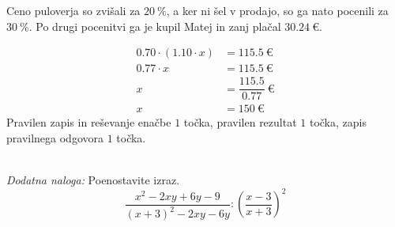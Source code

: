 \documentclass[addpoints]{exam}
\begin{document}
\begin{questions}
        \newpage


        \question
        Ceno puloverja so zvišali za $20~\%$, a ker ni šel v prodajo, so ga nato pocenili za $30~\%$.
        Po drugi pocenitvi ga je kupil Matej in zanj plačal $30.24~\euro$.


        \begin{solution}[4cm]
            \begin{align*}
                0.70\cdot \left(1.10\cdot x\right) &=115.5~\euro \\
                                     0.77 \cdot x &= 115.5~\euro \\
                                                x &= \dfrac{115.5}{0.77}~\euro \\
                                                x &= 150~\euro
            \end{align*}
            Pravilen zapis in reševanje enačbe $1$ točka, pravilen rezultat $1$ točka, zapis pravilnega odgovora $1$ točka.
        \end{solution}
     ~\\


    \bonusquestion[4]
    \textit{Dodatna naloga:} Poenostavite izraz. $$ \dfrac{x^2-2xy+6y-9}{(x+3)^2-2xy-6y}:\left(\dfrac{x-3}{x+3}\right)^2 $$


\end{questions}
\end{document}
